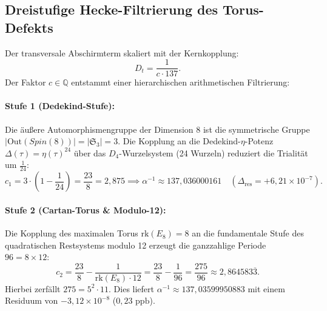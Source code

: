 \documentclass[11pt,a4paper]{article}
\begin{document}
\subsection{Dreistufige Hecke-Filtrierung des Torus-Defekts}
Der transversale Abschirmterm skaliert mit der Kernkopplung:
\begin{equation}
D_t = \frac{1}{c \cdot 137}.
\end{equation}
Der Faktor $c \in \mathbb{Q}$ entstammt einer hierarchischen arithmetischen Filtrierung:

\paragraph{Stufe 1 (Dedekind-Stufe):}
Die äußere Automorphismengruppe der Dimension 8 ist die symmetrische Gruppe $|\mathrm{Out}(Spin(8))| = |\mathfrak{S}_3| = 3$. Die Kopplung an die Dedekind-$\eta$-Potenz $\Delta(\tau) = \eta(\tau)^{24}$ über das $D_4$-Wurzelsystem (24 Wurzeln) reduziert die Trialität um $\frac{1}{24}$:
\begin{equation}
c_1 = 3 \cdot \left(1 - \frac{1}{24}\right) = \frac{23}{8} = 2{,}875 \implies \alpha^{-1} \approx 137{,}036000161 \quad (\Delta_{\mathrm{res}} = +6{,}21 \times 10^{-7}).
\end{equation}

\paragraph{Stufe 2 (Cartan-Torus \& Modulo-12):}
Die Kopplung des maximalen Torus $\mathrm{rk}(E_8) = 8$ an die fundamentale Stufe des quadratischen Restsystems modulo 12 erzeugt die ganzzahlige Periode $96 = 8 \times 12$:
\begin{equation}
c_2 = \frac{23}{8} - \frac{1}{\mathrm{rk}(E_8) \cdot 12} = \frac{23}{8} - \frac{1}{96} = \frac{275}{96} \approx 2{,}864583\overline{3}.
\end{equation}
Hierbei zerfällt $275 = 5^2 \cdot 11$. Dies liefert $\alpha^{-1} \approx 137{,}03599950883$ mit einem Residuum von $-3{,}12 \times 10^{-8}$ ($0{,}23\text{ ppb}$).
\end{document}
